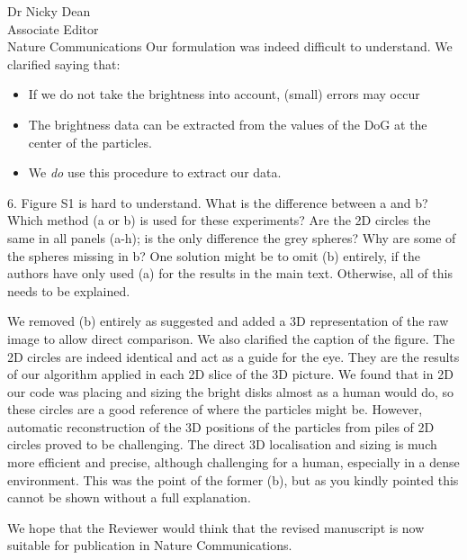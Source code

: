 \documentclass[a4paper, rebuttal, parskip=true, firsthead=false, fromemail=true, foldmarks=false]{scrlttr2}
\begin{document}
\begin{letter}{Dr Nicky Dean\\
Associate Editor\\
Nature Communications}
Our formulation was indeed difficult to understand. We clarified saying that:
\begin{itemize}
\item If we do not take the brightness into account, (small) errors may occur
\item The brightness data can be extracted from the values of the DoG at the center of the particles.
\item We \emph{do} use this procedure to extract our data.
\end{itemize}

\begin{quotationi}
6. Figure S1 is hard to understand. What is the difference between a and b? Which method (a or b) is used for these experiments? Are the 2D circles the same in all panels (a-h); is the only difference the grey spheres? Why are some of the spheres missing in b? One solution might be to omit (b) entirely, if the authors have only used (a) for the results in the main text. Otherwise, all of this needs to be explained.
\end{quotationi}

We removed (b) entirely as suggested and added a 3D representation of the raw image to allow direct comparison. We also clarified the caption of the figure. The 2D circles are indeed identical and act as a guide for the eye. They are the results of our algorithm applied in each 2D slice of the 3D picture. We found that in 2D our code was placing and sizing the bright disks almost as a human would do, so these circles are a good reference of where the particles might be. However, automatic reconstruction of the 3D positions of the particles from piles of 2D circles proved to be challenging. The direct 3D localisation and sizing is much more efficient and precise, although challenging for a human, especially in a dense environment. This was the point of the former (b), but as you kindly pointed this cannot be shown without a full explanation.


We hope that the Reviewer would think that the revised manuscript is now suitable for publication in Nature Communications. 


\end{letter} 
\end{document}

